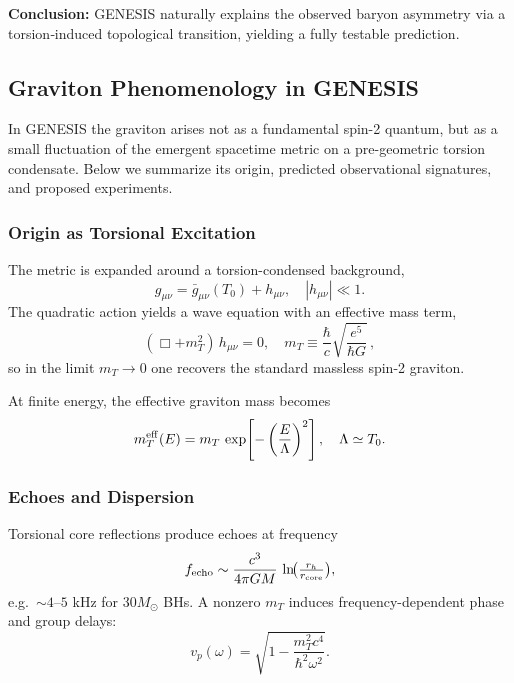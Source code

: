 \documentclass{article}
\begin{document}
\noindent\textbf{Conclusion:}  
GENESIS naturally explains the observed baryon asymmetry via a
torsion‐induced topological transition, yielding a fully testable prediction.

\medskip
\begin{center}
\end{center}
\medskip



\subsection{Graviton Phenomenology in GENESIS}
\label{subsec:graviton_phenomenology}

In GENESIS the graviton arises not as a fundamental spin-2 quantum, but as
a small fluctuation of the emergent spacetime metric on a pre-geometric torsion
condensate.  Below we summarize its origin, predicted observational signatures,
and proposed experiments.

\subsubsection{ Origin as Torsional Excitation}
The metric is expanded around a torsion-condensed background,
\[
  g_{\mu\nu} = \bar g_{\mu\nu}(T_0) + h_{\mu\nu},
  \quad |h_{\mu\nu}|\ll1.
\]
The quadratic action yields a wave equation with an effective mass term,
\[
  (\Box + m_T^2)\,h_{\mu\nu} = 0,
  \quad m_T \equiv \frac{\hbar}{c}\sqrt{\frac{e^5}{\hbar G}}\,,
\]
so in the limit \(m_T\to0\) one recovers the standard massless spin-2 graviton.

At finite energy, the effective graviton mass becomes
\[
  m_T^{\rm eff}(E)
  = m_T\,\exp\!\left[-\left(\frac{E}{\Lambda}\right)^2\right],
  \quad \Lambda \simeq T_0.
\]



\subsubsection{ Echoes and Dispersion}
Torsional core reflections produce echoes at frequency
\[
  f_{\rm echo}\sim \frac{c^3}{4\pi GM}\,\ln\!\bigl(\tfrac{r_h}{r_{\rm core}}\bigr),
\]
e.g.\ \(\sim4\text{–}5\) kHz for \(30M_\odot\) BHs.  A nonzero \(m_T\) induces
frequency-dependent phase and group delays:
\[
  v_p(\omega)=\sqrt{1 - \frac{m_T^2c^4}{\hbar^2\omega^2}}.
\]
\end{document}

